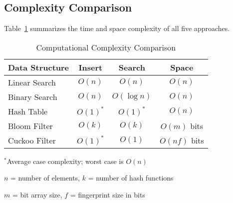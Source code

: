 \subsection{Complexity Comparison}

Table~\ref{tab:complexity} summarizes the time and space complexity of all five approaches.

\begin{table}[h]
\centering
\caption{Computational Complexity Comparison}
\label{tab:complexity}
\begin{tabular}{@{}lccc@{}}
\toprule
\textbf{Data Structure} & \textbf{Insert} & \textbf{Search} & \textbf{Space} \\
\midrule
Linear Search & $O(n)$ & $O(n)$ & $O(n)$ \\
Binary Search & $O(n)$ & $O(\log n)$ & $O(n)$ \\
Hash Table & $O(1)^*$ & $O(1)^*$ & $O(n)$ \\
Bloom Filter & $O(k)$ & $O(k)$ & $O(m)$ bits \\
Cuckoo Filter & $O(1)^*$ & $O(1)$ & $O(nf)$ bits \\
\bottomrule
\end{tabular}
\begin{tablenotes}
\small
\item $^*$Average case complexity; worst case is $O(n)$
\item $n$ = number of elements, $k$ = number of hash functions
\item $m$ = bit array size, $f$ = fingerprint size in bits
\end{tablenotes}
\end{table}

